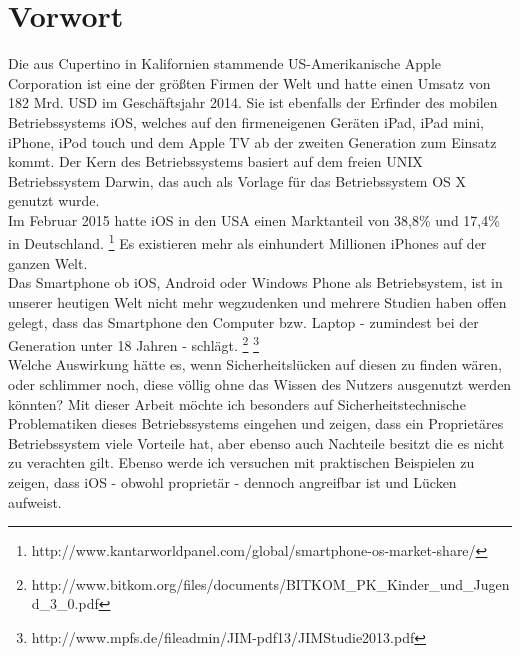 \section{Vorwort}
	Die aus Cupertino in Kalifornien stammende US-Amerikanische Apple Corporation
	ist eine der größten Firmen der Welt und hatte einen Umsatz von 182 Mrd.
	USD im Geschäftsjahr 2014. Sie ist ebenfalls der Erfinder des mobilen
	Betriebssystems iOS, welches auf den firmeneigenen Geräten iPad, iPad mini,
	iPhone, iPod touch und dem Apple TV ab der zweiten Generation zum Einsatz kommt.
	Der Kern des Betriebssystems basiert auf dem freien UNIX Betriebssystem Darwin,
	das auch als Vorlage für das Betriebssystem OS X genutzt wurde.\\
	Im Februar 2015 hatte iOS in den USA einen Marktanteil von 38,8\% und 17,4\%
	in Deutschland.
	\footnote{http://www.kantarworldpanel.com/global/smartphone-os-market-share/}
	Es existieren mehr als einhundert Millionen iPhones auf der ganzen Welt.\\
	Das Smartphone ob iOS, Android oder Windows Phone als Betriebsystem, ist in
	unserer heutigen Welt nicht mehr wegzudenken und mehrere Studien haben offen
	gelegt, dass das Smartphone den Computer bzw. Laptop - zumindest bei der
	Generation unter 18 Jahren - schlägt.
	\footnote{http://www.bitkom.org/files/documents/BITKOM\_PK\_Kinder\_und\_Jugend\_3\_0.pdf}
	\footnote{http://www.mpfs.de/fileadmin/JIM-pdf13/JIMStudie2013.pdf}\\
	Welche Auswirkung hätte es, wenn Sicherheitslücken auf diesen zu finden wären,
	oder schlimmer noch, diese völlig ohne das Wissen des Nutzers ausgenutzt werden
	könnten? Mit dieser Arbeit möchte ich besonders auf Sicherheitstechnische
	Problematiken dieses Betriebssystems eingehen und zeigen, dass ein Proprietäres
	Betriebssystem viele Vorteile hat, aber ebenso auch Nachteile besitzt die es nicht zu verachten gilt. 
	Ebenso werde ich versuchen mit praktischen Beispielen zu zeigen, dass iOS -
	obwohl proprietär - dennoch angreifbar ist und Lücken aufweist.